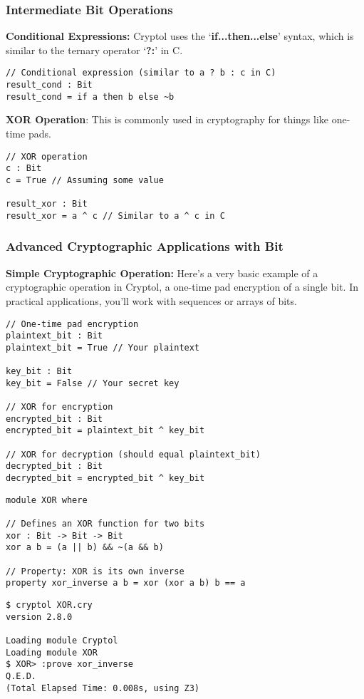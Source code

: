 \subsubsection{Intermediate Bit Operations}

\textbf{Conditional Expressions:} Cryptol uses the `\textbf{if...then...else}' syntax, which is similar to the ternary operator `\textbf{?:}' in C.

\begin{lstlisting}[style=cryptol]
// Conditional expression (similar to a ? b : c in C)
result_cond : Bit
result_cond = if a then b else ~b
\end{lstlisting}

\textbf{XOR Operation}: This is commonly used in cryptography for things like one-time pads.

\begin{lstlisting}[style=cryptol]
// XOR operation
c : Bit
c = True // Assuming some value

result_xor : Bit
result_xor = a ^ c // Similar to a ^ c in C
\end{lstlisting}


\subsubsection{Advanced Cryptographic Applications with Bit}
\textbf{Simple Cryptographic Operation:} Here’s a very basic example of a cryptographic operation in Cryptol, a one-time pad encryption of a single bit. In practical applications, you'll work with sequences or arrays of bits.

\begin{lstlisting}[style=cryptol]
// One-time pad encryption
plaintext_bit : Bit
plaintext_bit = True // Your plaintext

key_bit : Bit
key_bit = False // Your secret key

// XOR for encryption
encrypted_bit : Bit
encrypted_bit = plaintext_bit ^ key_bit

// XOR for decryption (should equal plaintext_bit)
decrypted_bit : Bit
decrypted_bit = encrypted_bit ^ key_bit           
\end{lstlisting}

\begin{lstlisting}[style=cryptol]
module XOR where

// Defines an XOR function for two bits
xor : Bit -> Bit -> Bit
xor a b = (a || b) && ~(a && b)

// Property: XOR is its own inverse
property xor_inverse a b = xor (xor a b) b == a
\end{lstlisting}
\begin{lstlisting}[style=zsh]
$ cryptol XOR.cry
version 2.8.0

Loading module Cryptol
Loading module XOR
$ XOR> :prove xor_inverse
Q.E.D.
(Total Elapsed Time: 0.008s, using Z3)
\end{lstlisting}

